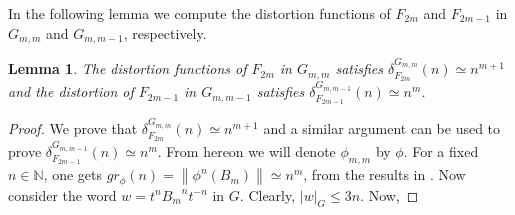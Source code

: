 \documentclass[oneside,11pt,reqno]{amsart}
\newtheorem{lem}[thm]{Lemma}
\theoremstyle{definition}
\newcommand{\norm}[1]{\left\lVert{#1}\right\rVert}
\begin{document}
In the following lemma we compute the distortion functions of $F_{2m}$ and $F_{2m-1}$ in $G_{m,m}$ and $G_{m,m-1}$, respectively.

\begin{lem}\label{BSdist} 
The distortion functions of $F_{2m}$ in $G_{m,m}$ satisfies $\delta_{F_{2m}}^{G_{m,m}} (n) \simeq n^{m+1}$  and the distortion of  ${F_{2m-1}}$ in $G_{m,m-1}$ satisfies $\delta_{F_{2m-1}}^{G_{m,m-1}} (n) \simeq n^{m}$.
\end{lem}

\begin{proof}

We prove that $\delta_{F_{2m}}^{G_{m,m}} (n) \simeq n^{m+1}$ and a similar argument can be used to prove $\delta_{F_{2m-1}}^{G_{m,m-1}} (n) \simeq n^{m}$. From hereon we will denote $\phi_{m,m}$ by $\phi$. For a fixed $n \in \mathbb{N}$, one gets $gr_{\phi} (n) = \norm{\phi^n(B_m)} \simeq n^m$, from the results in \cite[Section 8]{BS}. Now consider the word $w=t^n{B_m}^nt^{-n}$ in $G$.  Clearly, $|w|_G \leq 3n$. Now, 



\end{proof}
\end{document}
